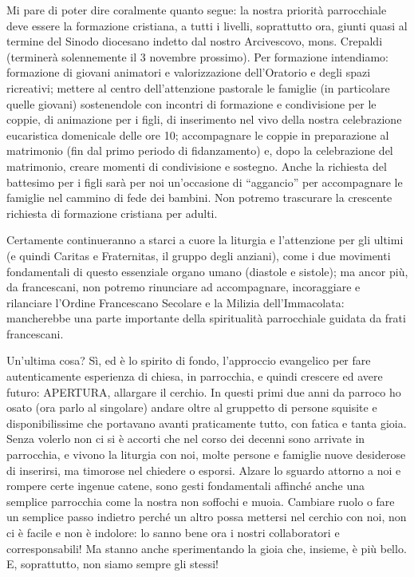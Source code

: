 Mi pare di poter dire coralmente quanto segue: la nostra priorità parrocchiale deve essere la 
formazione  cristiana, a tutti i livelli, soprattutto ora, giunti quasi al termine del Sinodo diocesano 
indetto dal nostro Arcivescovo, mons. Crepaldi (terminerà solennemente il 3 novembre prossimo).
Per formazione intendiamo: formazione di giovani animatori e valorizzazione dell’Oratorio e degli 
spazi ricreativi; mettere al centro dell’attenzione pastorale le famiglie (in particolare quelle giovani) 
sostenendole con incontri di formazione e condivisione per le coppie, di animazione per i figli, di 
inserimento nel vivo della nostra celebrazione eucaristica domenicale delle ore 10; accompagnare le 
coppie in preparazione al matrimonio (fin dal primo periodo di fidanzamento) e, dopo la 
celebrazione del matrimonio, creare momenti di condivisione e sostegno. Anche la richiesta del 
battesimo per i figli sarà per noi un’occasione di “aggancio” per accompagnare le famiglie nel 
cammino di fede dei bambini. Non potremo trascurare la crescente richiesta di formazione cristiana 
per adulti.

Certamente continueranno a starci a cuore la liturgia e l’attenzione per gli ultimi (e quindi 
Caritas e Fraternitas, il gruppo degli anziani), come i due movimenti fondamentali di questo 
essenziale organo umano (diastole e sistole); ma ancor più, da francescani, non potremo rinunciare 
ad accompagnare, incoraggiare e rilanciare l’Ordine Francescano Secolare e la Milizia 
dell’Immacolata: mancherebbe una parte importante della spiritualità parrocchiale guidata da frati 
francescani.

Un’ultima cosa? Sì, ed è lo spirito di fondo, l’approccio evangelico per fare autenticamente 
esperienza di chiesa, in parrocchia, e quindi crescere ed avere futuro: APERTURA, allargare il 
cerchio. In questi primi due anni da parroco ho osato (ora parlo al singolare) andare oltre al 
gruppetto di persone squisite e disponibilissime che portavano avanti praticamente tutto, con fatica 
e tanta gioia. Senza volerlo non ci si è accorti che nel corso dei decenni sono arrivate in parrocchia, 
e vivono la liturgia con noi, molte persone e famiglie nuove desiderose di inserirsi, ma timorose nel 
chiedere o esporsi. Alzare lo sguardo attorno a noi e rompere certe ingenue catene, sono gesti 
fondamentali affinché anche una semplice parrocchia come la nostra non soffochi e muoia. 
Cambiare ruolo o fare un semplice passo indietro perché un altro possa mettersi nel cerchio con noi, 
non ci è facile e non è indolore: lo sanno bene ora i nostri collaboratori e corresponsabili! Ma stanno 
anche sperimentando la gioia che, insieme, è più bello. E, soprattutto, non siamo sempre gli stessi!

